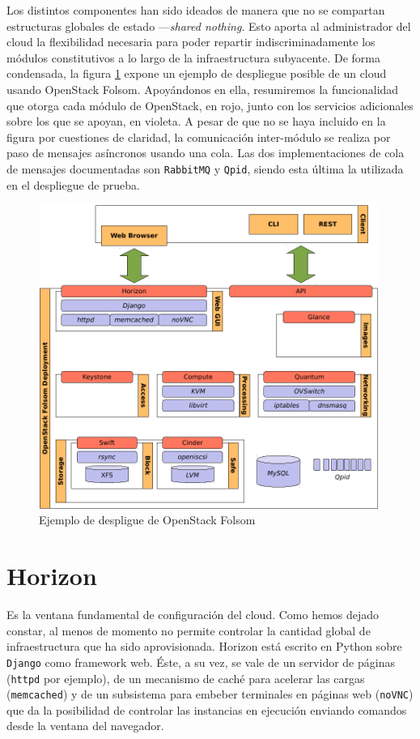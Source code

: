 Los distintos componentes han sido ideados de manera que no se compartan estructuras globales de estado ---\emph{shared nothing}. Esto aporta al administrador del cloud la flexibilidad necesaria para poder repartir indiscriminadamente los m\'odulos constitutivos a lo largo de la infraestructura subyacente. De forma condensada, la figura \ref{fig:despliegueos} expone un ejemplo de despliegue posible de un cloud usando OpenStack Folsom. Apoy\'andonos en ella, resumiremos la funcionalidad que otorga cada m\'odulo de OpenStack, en rojo, junto con los servicios adicionales sobre los que se apoyan, en violeta. A pesar de que no se haya incluido en la figura por cuestiones de claridad, la comunicaci\'on inter-m\'odulo se realiza por paso de mensajes as\'incronos usando una cola. Las dos implementaciones de cola de mensajes documentadas son \texttt{RabbitMQ} y \texttt{Qpid}, siendo esta \'ultima la utilizada en el despliegue de prueba.

\begin{figure}[tbp]
\begin{center}
\includegraphics[width=0.99\textwidth]{imagenes/011.pdf}
 \caption{Ejemplo de despligue de OpenStack Folsom}
\label{fig:despliegueos}
\end{center}
\end{figure}


\section{Horizon}\label{sec:horizon}
\noindent Es la ventana fundamental de configuraci\'on del cloud. Como hemos dejado constar, al menos de momento no permite controlar la cantidad global de infraestructura que ha sido aprovisionada. Horizon est\'a escrito en Python sobre \texttt{Django} como framework web. \'Este, a su vez, se vale de un servidor de p\'aginas (\texttt{httpd} por ejemplo), de un mecanismo de cach\'e para acelerar las cargas (\texttt{memcached}) y de un subsistema para embeber terminales en p\'aginas web (\texttt{noVNC}) que da la posibilidad de controlar las instancias en ejecuci\'on enviando comandos desde la ventana del navegador.\newline

